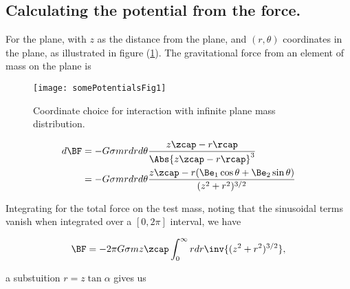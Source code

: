 \subsection{Calculating the potential from the force.}

For the plane, with $z$ as the distance from the plane, and $(r,\theta)$ coordinates in the plane, as illustrated in figure (\ref{fig:classicalMechanicsPs2:somePotentialsFig1}).  The gravitational force from an element of mass on the plane is
\begin{figure}[htp]
   \centering
   \texttt{[image: somePotentialsFig1]}
   \caption{Coordinate choice for interaction with infinite plane mass distribution.}\label{fig:classicalMechanicsPs2:somePotentialsFig1}
\end{figure}

\begin{align*}
d\BF
&= -G \sigma m r dr d\theta \frac{z \zcap - r \rcap}{\Abs{z \zcap - r \rcap}^3 } \\
&= -G \sigma m r dr d\theta \frac{z \zcap - r (\Be_1 \cos\theta + \Be_2 \sin\theta) }{(z^2 + r^2)^{3/2} } \\
\end{align*}

%
%
Integrating for the total force on the test mass, noting that the sinusoidal terms vanish when integrated over a $[0, 2 \pi]$ interval, we have

\begin{equation}\label{eqn:classicalMechanicsPs2:10}
\BF = - 2 \pi G \sigma m z \zcap \int_0^\infty r dr \inv{(z^2 + r^2)^{3/2} },
\end{equation}

a substuition $r = z \tan \alpha$ gives us

